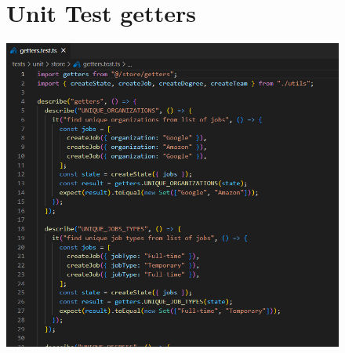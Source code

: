\documentclass[ 4paper,11pt,openany]{book}
\begin{document}
\begin{figure}[htpb!] 
	\section{Unit Test getters}
	\centering 
	\includegraphics{getterTestExample.png}
\end{figure}
\end{document}
